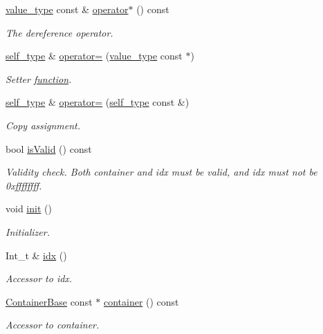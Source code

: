 \begin{DoxyCompactItemize}
\hyperlink{classpanda_1_1Ref_a52b7615b884eb959c20ef4fd8f23ded0}{value\_\-type} const \& \hyperlink{classpanda_1_1Ref_a2250860a67770a88aae27c82f3be2a11}{operator$\ast$} () const 
\begin{DoxyCompactList}\small\item\em The dereference operator. \item\end{DoxyCompactList}\item 
\hyperlink{classpanda_1_1Ref}{self\_\-type} \& \hyperlink{classpanda_1_1Ref_a76aa1d8abb4d45935c3b3b75bb50d161}{operator=} (\hyperlink{classpanda_1_1Ref_a52b7615b884eb959c20ef4fd8f23ded0}{value\_\-type} const $\ast$)
\begin{DoxyCompactList}\small\item\em Setter \hyperlink{namespacepanda_1_1function}{function}. \item\end{DoxyCompactList}\item 
\hyperlink{classpanda_1_1Ref}{self\_\-type} \& \hyperlink{classpanda_1_1Ref_a5d4fbf20bb02e812ab035499aef85240}{operator=} (\hyperlink{classpanda_1_1Ref}{self\_\-type} const \&)
\begin{DoxyCompactList}\small\item\em Copy assignment. \item\end{DoxyCompactList}\item 
bool \hyperlink{classpanda_1_1Ref_a9260daa9c89d0775f2a1058a48e23bcb}{isValid} () const 
\begin{DoxyCompactList}\small\item\em Validity check. Both container and idx must be valid, and idx must not be 0xffffffff. \item\end{DoxyCompactList}\item 
void \hyperlink{classpanda_1_1Ref_af378c309fd6b7945a4e18eea5e041a89}{init} ()
\begin{DoxyCompactList}\small\item\em Initializer. \item\end{DoxyCompactList}\item 
Int\_\-t \& \hyperlink{classpanda_1_1Ref_adc0eaedf3db52609635a3e09a395375a}{idx} ()
\begin{DoxyCompactList}\small\item\em Accessor to idx. \item\end{DoxyCompactList}\item 
\hyperlink{classpanda_1_1ContainerBase}{ContainerBase} const $\ast$ \hyperlink{classpanda_1_1Ref_a1249f0bb38474905f0da01ead67b2c5f}{container} () const 
\begin{DoxyCompactList}\small\item\em Accessor to container. \item\end{DoxyCompactList}\end{DoxyCompactItemize}


